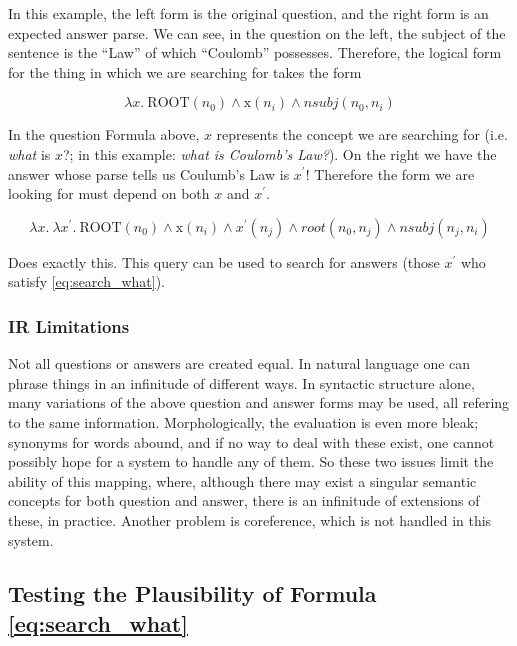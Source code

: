 \documentclass[twoside]{article}
\begin{document}
In this example, the left form is the original question, and the right form is an expected answer parse.  We can see, in the question on the left, the subject of the sentence is the ``Law'' of which ``Coulomb'' possesses.  Therefore, the logical form for the thing in which we are searching for takes the form

\begin{equation}
\lambda x.\ \text{ROOT}(n_0) \wedge \text{x}(n_i) \wedge nsubj(n_0, n_i)
\end{equation}

In the question Formula above, $x$ represents the concept we are searching for (i.e. \textit{what} is $x$?; in this example: \textit{what is Coulomb's Law?}).  On the right we have the answer whose parse tells us Coulumb's Law is $x^\prime$!  Therefore the form we are looking for must depend on both $x$ and $x^\prime$.

\begin{equation} \label{eq:search_what}
\lambda x.\ \lambda x^\prime.\ \text{ROOT}(n_0) \wedge \text{x}(n_i) \wedge \text{$x^\prime$}(n_j) \wedge root(n_0, n_j) \wedge nsubj(n_j, n_i) 
\end{equation}

Does exactly this.  This query can be used to search for answers (those $x^\prime$ who satisfy \ref{eq:search_what}).

\subsubsection{IR Limitations} Not all questions or answers are created equal.  In natural language one can phrase things in an infinitude of different ways.  In syntactic structure alone, many variations of the above question and answer forms may be used, all refering to the same information. Morphologically, the evaluation is even more bleak; synonyms for words abound, and if no way to deal with these exist, one cannot possibly hope for a system to handle any of them.  So these two issues limit the ability of this mapping, where, although there may exist a singular semantic concepts for both question and answer, there is an infinitude of extensions of these, in practice.  Another problem is coreference, which is not handled in this system.

\subsection{Testing the Plausibility of Formula \ref{eq:search_what}}
\end{document}
